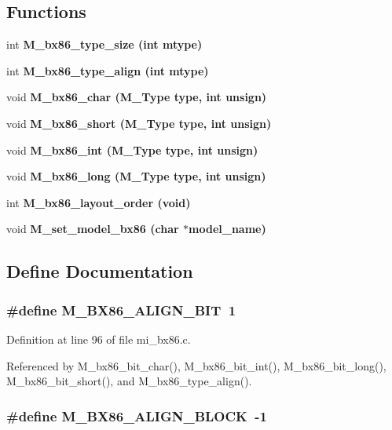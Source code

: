 \subsection*{Functions}
\begin{CompactItemize}
\item 
int \bf{M\_\-bx86\_\-type\_\-size} (int mtype)
\item 
int \bf{M\_\-bx86\_\-type\_\-align} (int mtype)
\item 
void \bf{M\_\-bx86\_\-char} (\bf{M\_\-Type} type, int unsign)
\item 
void \bf{M\_\-bx86\_\-short} (\bf{M\_\-Type} type, int unsign)
\item 
void \bf{M\_\-bx86\_\-int} (\bf{M\_\-Type} type, int unsign)
\item 
void \bf{M\_\-bx86\_\-long} (\bf{M\_\-Type} type, int unsign)
\item 
int \bf{M\_\-bx86\_\-layout\_\-order} (void)
\item 
void \bf{M\_\-set\_\-model\_\-bx86} (char $\ast$model\_\-name)
\end{CompactItemize}


\subsection{Define Documentation}
\subsubsection{\setlength{\rightskip}{0pt plus 5cm}\#define M\_\-BX86\_\-ALIGN\_\-BIT~1}\label{mi__bx86_8c_7c6024834ddf5dd4bf4742a40ad57c74}




Definition at line 96 of file mi\_\-bx86.c.

Referenced by M\_\-bx86\_\-bit\_\-char(), M\_\-bx86\_\-bit\_\-int(), M\_\-bx86\_\-bit\_\-long(), M\_\-bx86\_\-bit\_\-short(), and M\_\-bx86\_\-type\_\-align().
\subsubsection{\setlength{\rightskip}{0pt plus 5cm}\#define M\_\-BX86\_\-ALIGN\_\-BLOCK~-1}\label{mi__bx86_8c_bd9e71c4c7cfefe0f634a40d554ec6cd}




